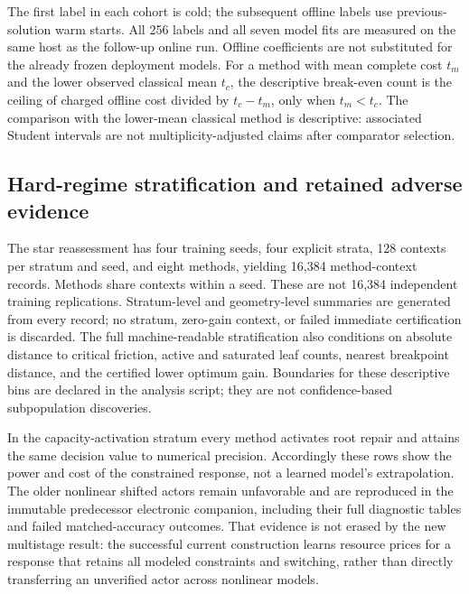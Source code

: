 The first label in each cohort is cold; the subsequent offline labels use previous-solution warm starts. All 256 labels and all seven model fits are measured on the same host as the follow-up online run. Offline coefficients are not substituted for the already frozen deployment models. For a method with mean complete cost $t_m$ and the lower observed classical mean $t_c$, the descriptive break-even count is the ceiling of charged offline cost divided by $t_c-t_m$, only when $t_m<t_c$. The comparison with the lower-mean classical method is descriptive: associated Student intervals are not multiplicity-adjusted claims after comparator selection.


\subsection{Hard-regime stratification and retained adverse evidence}
The star reassessment has four training seeds, four explicit strata, 128 contexts per stratum and seed, and eight methods, yielding 16,384 method-context records. Methods share contexts within a seed. These are not 16,384 independent training replications. Stratum-level and geometry-level summaries are generated from every record; no stratum, zero-gain context, or failed immediate certification is discarded. The full machine-readable stratification also conditions on absolute distance to critical friction, active and saturated leaf counts, nearest breakpoint distance, and the certified lower optimum gain. Boundaries for these descriptive bins are declared in the analysis script; they are not confidence-based subpopulation discoveries.

In the capacity-activation stratum every method activates root repair and attains the same decision value to numerical precision. Accordingly these rows show the power and cost of the constrained response, not a learned model's extrapolation. The older nonlinear shifted actors remain unfavorable and are reproduced in the immutable predecessor electronic companion, including their full diagnostic tables and failed matched-accuracy outcomes. That evidence is not erased by the new multistage result: the successful current construction learns resource prices for a response that retains all modeled constraints and switching, rather than directly transferring an unverified actor across nonlinear models.

